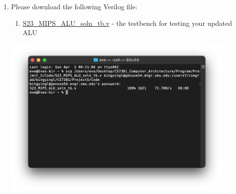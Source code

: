 \documentclass[12pt]{article}
\begin{document}
\begin{enumerate}
    \item Please download the following Verilog file:
    \begin{enumerate}
        \item \href{https://smu.instructure.com/courses/106177/files/7254941?wrap=1}{S23\_MIPS\_ALU\_soln\_tb.v} - the testbench for testing your updated ALU
    \end{enumerate}
    \begin{center}
        \includegraphics[width=0.9\textwidth]{p3.png}
    \end{center}
    

\end{enumerate}
\end{document}
